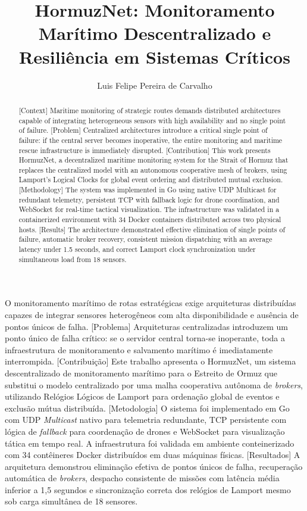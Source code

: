 \documentclass[12pt]{article}
\title{HormuzNet: Monitoramento Marítimo Descentralizado e Resiliência em Sistemas Críticos}
\author{Luis Felipe Pereira de Carvalho\inst{1}}
\begin{document}
\maketitle

\begin{abstract}
[Context] Maritime monitoring of strategic routes demands distributed architectures
capable of integrating heterogeneous sensors with high availability and no single
point of failure. [Problem] Centralized architectures introduce a critical single
point of failure: if the central server becomes inoperative, the entire monitoring
and maritime rescue infrastructure is immediately disrupted. [Contribution] This
work presents HormuzNet, a decentralized maritime monitoring system for the Strait
of Hormuz that replaces the centralized model with an autonomous cooperative mesh
of brokers, using Lamport's Logical Clocks for global event ordering and distributed
mutual exclusion. [Methodology] The system was implemented in Go using native UDP
Multicast for redundant telemetry, persistent TCP with fallback logic for drone
coordination, and WebSocket for real-time tactical visualization. The infrastructure
was validated in a containerized environment with 34 Docker containers distributed
across two physical hosts. [Results] The architecture demonstrated effective
elimination of single points of failure, automatic broker recovery, consistent
mission dispatching with an average latency under 1.5 seconds, and correct Lamport
clock synchronization under simultaneous load from 18 sensors.
\end{abstract}

\begin{resumo}
\sloppy
[Contexto] O monitoramento marítimo de rotas estratégicas exige arquiteturas
distribuídas capazes de integrar sensores heterogêneos com alta disponibilidade
e ausência de pontos únicos de falha. [Problema] Arquiteturas centralizadas
introduzem um ponto único de falha crítico: se o servidor central torna-se
inoperante, toda a infraestrutura de monitoramento e salvamento marítimo é
imediatamente interrompida. [Contribuição] Este trabalho apresenta o HormuzNet,
um sistema descentralizado de monitoramento marítimo para o Estreito de Ormuz que
substitui o modelo centralizado por uma malha cooperativa autônoma de \textit{brokers},
utilizando Relógios Lógicos de Lamport para ordenação global de eventos e exclusão
mútua distribuída. [Metodologia] O sistema foi implementado em Go com UDP
\textit{Multicast} nativo para telemetria redundante, TCP persistente com lógica de
\textit{fallback} para coordenação de drones e WebSocket para visualização tática
em tempo real. A infraestrutura foi validada em ambiente conteinerizado com 34
contêineres Docker distribuídos em duas máquinas físicas. [Resultados] A arquitetura
demonstrou eliminação efetiva de pontos únicos de falha, recuperação automática de
\textit{brokers}, despacho consistente de missões com latência média inferior a 1,5
segundos e sincronização correta dos relógios de Lamport mesmo sob carga
simultânea de 18 sensores.
\end{resumo}
\end{document}
